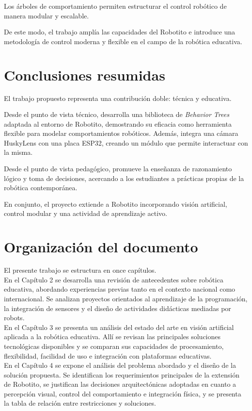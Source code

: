 \documentclass{prgrado}
\begin{document}
Los árboles de comportamiento permiten estructurar el control robótico de manera modular y escalable.

De este modo, el trabajo amplía las capacidades del Robotito e introduce una metodología de control moderna y flexible en el campo de la robótica educativa.

\section{Conclusiones resumidas}
El trabajo propuesto representa una contribución doble: técnica y educativa.

Desde el punto de vista técnico, desarrolla una biblioteca de \textit{Behavior Trees} adaptada al entorno de Robotito, demostrando su eficacia como herramienta flexible para modelar comportamientos robóticos. Además, integra una cámara HuskyLens con una placa ESP32, creando un módulo que permite interactuar con la misma.

Desde el punto de vista pedagógico, promueve la enseñanza de razonamiento lógico y toma de decisiones, acercando a los estudiantes a prácticas propias de la robótica contemporánea.

En conjunto, el proyecto extiende a Robotito incorporando visión artificial, control modular y una actividad de aprendizaje activo.

\section{Organización del documento}
El presente trabajo se estructura en once capítulos. \\

En el Capítulo 2 se desarrolla una revisión de antecedentes sobre robótica educativa, abordando experiencias previas tanto en el contexto nacional como internacional. Se analizan proyectos orientados al aprendizaje de la programación, la integración de sensores y el diseño de actividades didácticas mediadas por robots. \\

En el Capítulo 3 se presenta un análisis del estado del arte en visión artificial aplicada a la robótica educativa. Allí se revisan las principales soluciones tecnológicas disponibles y se comparan sus capacidades de procesamiento, flexibilidad, facilidad de uso e integración con plataformas educativas. \\

En el Capítulo 4 se expone el análisis del problema abordado y el diseño de la solución propuesta. Se identifican los requerimientos principales de la extensión de Robotito, se justifican las decisiones arquitectónicas adoptadas en cuanto a percepción visual, control del comportamiento e integración física, y se presenta la tabla de relación entre restricciones y soluciones. \\
\end{document}
